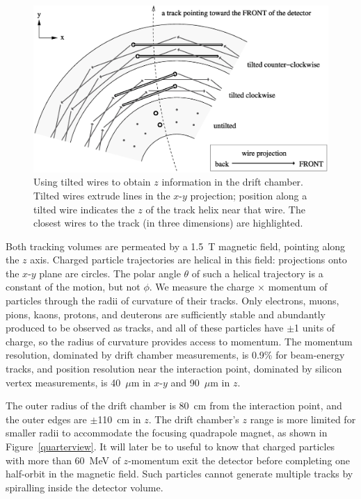 \documentclass{cornell}
\begin{document}
\begin{figure}[p]
  \begin{center}
    \includegraphics[width=\linewidth, viewport=0 480 892 947]{stereotwist}
  \end{center}
  \caption[Using tilted wires to obtain $z$ information in the drift
  chamber]{\label{stereotwist} Using tilted wires to obtain $z$
  information in the drift chamber.  Tilted wires extrude lines in the
  $x$-$y$ projection; position along a tilted wire indicates the $z$
  of the track helix near that wire.  The closest wires to the track
  (in three dimensions) are highlighted.}
\end{figure}

Both tracking volumes are permeated by a 1.5~T magnetic field,
pointing along the $z$ axis.  Charged particle trajectories are
helical in this field: projections onto the $x$-$y$ plane are circles.
The polar angle $\theta$ of such a helical trajectory is a constant of
the motion, but not $\phi$.  We measure the charge $\times$ momentum
of particles through the radii of curvature of their tracks.  Only
electrons, muons, pions, kaons, protons, and deuterons are
sufficiently stable and abundantly produced to be observed as tracks,
and all of these particles have $\pm$1 units of charge, so the radius
of curvature provides access to momentum.  The momentum resolution,
dominated by drift chamber measurements, is 0.9\% for beam-energy
tracks, and position resolution near the interaction point, dominated
by silicon vertex measurements, is 40~$\mu$m in $x$-$y$ and 90~$\mu$m
in $z$.

The outer radius of the drift chamber is 80~cm from the interaction
point, and the outer edges are $\pm$110~cm in $z$.  The drift
chamber's $z$ range is more limited for smaller radii to accommodate
the focusing quadrapole magnet, as shown in Figure~\ref{quarterview}.
It will later be to useful to know that charged particles with more than
60~MeV of $z$-momentum exit the detector before completing one
half-orbit in the magnetic field.  Such particles cannot generate
multiple tracks by spiralling inside the detector volume.
\label{pag:spiraling}
\end{document}
